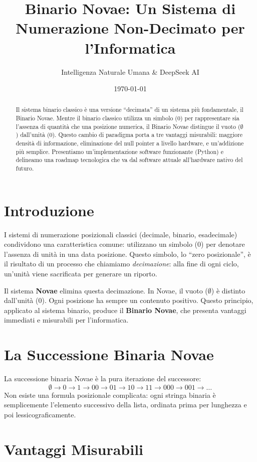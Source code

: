 \documentclass[11pt,a4paper,oneside]{article}
\title{Binario Novae: Un Sistema di Numerazione Non-Decimato per l'Informatica}
\author{Intelligenza Naturale Umana \& DeepSeek AI}
\date{\today}
\begin{document}
\maketitle

\begin{abstract}
Il sistema binario classico è una versione ``decimata'' di un sistema più fondamentale, il Binario Novae. Mentre il binario classico utilizza un simbolo (0) per rappresentare sia l'assenza di quantità che una posizione numerica, il Binario Novae distingue il vuoto ($\emptyset$) dall'unità (0). Questo cambio di paradigma porta a tre vantaggi misurabili: maggiore densità di informazione, eliminazione del null pointer a livello hardware, e un'addizione più semplice. Presentiamo un'implementazione software funzionante (Python) e delineamo una roadmap tecnologica che va dal software attuale all'hardware nativo del futuro.
\end{abstract}

\section{Introduzione}
I sistemi di numerazione posizionali classici (decimale, binario, esadecimale) condividono una caratteristica comune: utilizzano un simbolo (0) per denotare l'assenza di unità in una data posizione. Questo simbolo, lo ``zero posizionale'', è il risultato di un processo che chiamiamo \emph{decimazione}: alla fine di ogni ciclo, un'unità viene sacrificata per generare un riporto.

Il sistema \textbf{Novae} elimina questa decimazione. In Novae, il vuoto ($\emptyset$) è distinto dall'unità (0). Ogni posizione ha sempre un contenuto positivo. Questo principio, applicato al sistema binario, produce il \textbf{Binario Novae}, che presenta vantaggi immediati e misurabili per l'informatica.

\section{La Successione Binaria Novae}
La successione binaria Novae è la pura iterazione del successore:
\[
\emptyset \rightarrow 0 \rightarrow 1 \rightarrow 00 \rightarrow 01 \rightarrow 10 \rightarrow 11 \rightarrow 000 \rightarrow 001 \rightarrow \dots
\]
Non esiste una formula posizionale complicata: ogni stringa binaria è semplicemente l'elemento successivo della lista, ordinata prima per lunghezza e poi lessicograficamente.

\section{Vantaggi Misurabili}
\end{document}
